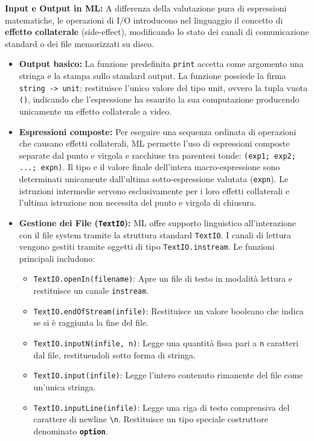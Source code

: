 \documentclass[12pt, a4paper]{article}
\begin{document}
\textbf{Input e Output in ML:}
A differenza della valutazione pura di espressioni matematiche, le operazioni di I/O introducono nel linguaggio il concetto di \textbf{effetto collaterale} (side-effect), modificando lo stato dei canali di comunicazione standard o dei file memorizzati su disco.
\begin{itemize}
    \item \textbf{Output basico:} La funzione predefinita \texttt{print} accetta come argomento una stringa e la stampa sullo standard output. La funzione possiede la firma \texttt{string -> unit}; restituisce l'unico valore del tipo unit, ovvero la tupla vuota \texttt{()}, indicando che l'espressione ha esaurito la sua computazione producendo unicamente un effetto collaterale a video.
    \item \textbf{Espressioni composte:} Per eseguire una sequenza ordinata di operazioni che causano effetti collaterali, ML permette l'uso di espressioni composte separate dal punto e virgola e racchiuse tra parentesi tonde: \texttt{(exp1; exp2; ...; expn)}. Il tipo e il valore finale dell'intera macro-espressione sono determinati unicamente dall'ultima sotto-espressione valutata (\texttt{expn}). Le istruzioni intermedie servono esclusivamente per i loro effetti collaterali e l'ultima istruzione non necessita del punto e virgola di chiusura.

\newpage
    
    \item \textbf{Gestione dei File (\texttt{TextIO}):} ML offre supporto linguistico all'interazione con il file system tramite la struttura standard \texttt{TextIO}. I canali di lettura vengono gestiti tramite oggetti di tipo \texttt{TextIO.instream}. Le funzioni principali includono:
    \begin{itemize}
        \item \texttt{TextIO.openIn(filename)}: Apre un file di testo in modalità lettura e restituisce un canale \texttt{instream}.
        \item \texttt{TextIO.endOfStream(infile)}: Restituisce un valore booleano che indica se si è raggiunta la fine del file.
        \item \texttt{TextIO.inputN(infile, n)}: Legge una quantità fissa pari a \texttt{n} caratteri dal file, restituendoli sotto forma di stringa.
        \item \texttt{TextIO.input(infile)}: Legge l'intero contenuto rimanente del file come un'unica stringa.
        \item \texttt{TextIO.inputLine(infile)}: Legge una riga di testo comprensiva del carattere di newline \texttt{\textbackslash n}. Restituisce un tipo speciale costruttore denominato \textbf{\texttt{option}}.
    \end{itemize}
\end{itemize}
\end{document}
